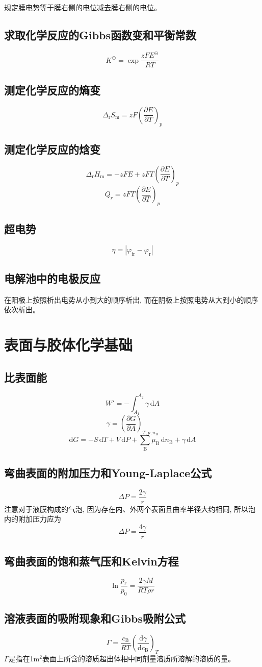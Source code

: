 \documentclass[twocolumn]{article}
\newcommand{\equ}[1]{\begin{equation*}#1\end{equation*}}
\newcommand{\rmd}{\mathrm{d}}
\newcommand{\drhm}{\Delta_{\mathrm{r}}H_{\rmm}}
\newcommand{\drsm}{\Delta_{\mathrm{r}}S_{\rmm}}
\newcommand{\rmB}{\mathrm{B}}
\newcommand{\rmm}{\mathrm{m}}
\newcommand{\subB}{_{\rmB}}
\newcommand{\std}{^{\circleddash}}
\newcommand{\xkh}[1]{\left(#1\right)}
\renewcommand{\dfrac}[2]{\frac{\rmd #1}{\rmd #2}}
\begin{document}
规定膜电势等于膜右侧的电位减去膜右侧的电位。
\subsection{求取化学反应的Gibbs函数变和平衡常数}
\equ{K\std=\exp\frac{zFE\std}{RT}}
\subsection{测定化学反应的熵变}
\equ{\drsm=zF\xkh{\frac{\partial E}{\partial T}}_{p}}
\subsection{测定化学反应的焓变}
\equ{\drhm=-zFE+zFT\xkh{\frac{\partial E}{\partial T}}_{p}}
\equ{Q_{r}=zFT\xkh{\frac{\partial E}{\partial T}}_{p}}
\subsection{超电势}
\equ{\eta=\left| \varphi_{\text{ir}}-\varphi_{\text{r}} \right|}
\subsection{电解池中的电极反应}
在阳极上按照析出电势从小到大的顺序析出, 而在阴极上按照电势从大到小的顺序依次析出。
\section{表面与胶体化学基础}
\subsection{比表面能}
\equ{W'=-\int_{A_{1}}^{A_{2}}\gamma\, \rmd A}
\equ{\gamma=\xkh{\frac{\partial G}{\partial A}}_{T, p, n\subB}}
\equ{\rmd G=-S\, \rmd T+V\, \rmd P+\sum\subB\mu\subB\, \rmd n \subB+\gamma\, \rmd A}
\subsection{弯曲表面的附加压力和Young-Laplace公式}
\equ{\Delta P=\frac{2\gamma}{r}}
注意对于液膜构成的气泡, 因为存在内、外两个表面且曲率半径大约相同, 所以泡内的附加压力应为
\equ{\Delta P=\frac{4\gamma}{r}}
\subsection{弯曲表面的饱和蒸气压和Kelvin方程}
\equ{\ln \frac{p_{r}}{p_{0}}=\frac{2\gamma M}{RT\rho r}}
\subsection{溶液表面的吸附现象和Gibbs吸附公式}
\equ{\Gamma=\frac{c\subB}{RT}\xkh{\dfrac{\gamma}{c\subB}}_{T}}
$\Gamma$是指在1m$^{2}$表面上所含的溶质超出体相中同剂量溶质所溶解的溶质的量。
\end{document}
